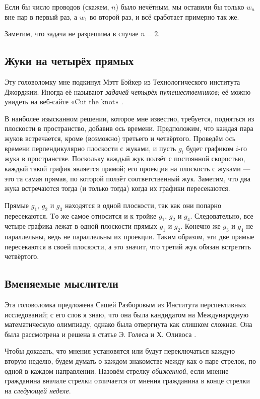 Если бы число проводов (скажем, $n$) было нечётным, мы оставили бы только $w_n$ вне пар в первый раз, а $w_1$ во второй раз, и всё сработает примерно так же.

\begin{addedbytheeditors}
Заметим, что задача не разрешима в случае $n=2$.
\end{addedbytheeditors}


\subsection*{Жуки на четырёх прямых}

Эту головоломку мне подкинул Мэтт Бэйкер из Технологического института Джорджии.
Иногда её называют \emph{задачей четырёх путешественников};
её можно увидеть на веб-сайте «Cut the knot» \cite{cut-the-knot}.

В наиболее изысканном решении, которое мне известно, требуется, подняться из плоскости в пространство, добавив ось времени.
Предположим, что каждая пара жуков встречается, кроме (возможно) третьего и четвёртого.
Проведём ось времени перпендикулярно плоскости с жуками, и пусть $g_i$ будет графиком $i$-го жука в пространстве.
Поскольку каждый жук ползёт с постоянной скоростью, каждый такой график является прямой;
его проекция на плоскость с жуками --- это та самая прямая, по которой ползёт соответственный жук.
Заметим, что два жука встречаются тогда (и только тогда) когда их графики пересекаются.

Прямые $g_1$, $g_2$ и $g_3$ находятся в одной плоскости, так как они попарно пересекаются.
Tо же самое относится и к тройке  $g_1$, $g_2$ и $g_4$.
Следовательно, все четыре графика лежат в одной плоскости прямых $g_1$ и $g_2$.
Конечно же $g_3$ и $g_4$ не параллельны, ведь не параллельны их проекции.
Таким образом, эти две прямые пересекаются в своей плоскости,
а это значит, что третий жук обязан встретить четвёртого.

\subsection*{Вменяемые мыслители}

Эта головоломка предложена Сашей Разборовым из Института перспективных исследований;
с его слов я знаю, что она была кандидатом на Международную математическую олимпиаду, однако была отвергнута как слишком сложная.
Она была рассмотрена и решена в статье Э. Голеса и Х. Оливоса \cite{goles-olivos}.

Чтобы доказать, что мнения установятся или будут переключаться каждую вторую неделю, будем думать о каждом знакомстве между как о паре стрелок, по одной в каждом направлении.
Назовём стрелку \emph{обиженной}, если мнение гражданина вначале стрелки отличается от мнения гражданина в конце стрелки на \emph{следующей неделе}.

